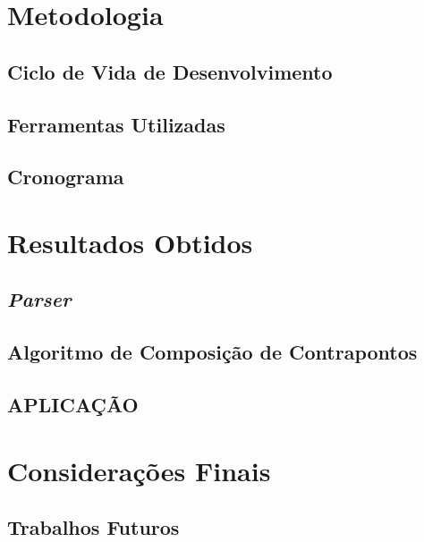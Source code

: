 \chapter[Metodologia]{Metodologia}

  \section[Ciclo de Vida de Desenvolvimento]{Ciclo de Vida de Desenvolvimento}
  \section[Ferramentas Utilizadas]{Ferramentas Utilizadas}
  \section[Cronograma]{Cronograma}

\chapter[Resultados Obtidos]{Resultados Obtidos}

  \section[\textit{Parser}]{\textit{Parser}}
  \section[Algoritmo de Composição de Contrapontos]{Algoritmo de Composição de Contrapontos}
  \section[APLICAÇÃO]{APLICAÇÃO}

\chapter[Considerações Finais]{Considerações Finais}

  \section[Trabalhos Futuros]{Trabalhos Futuros}
